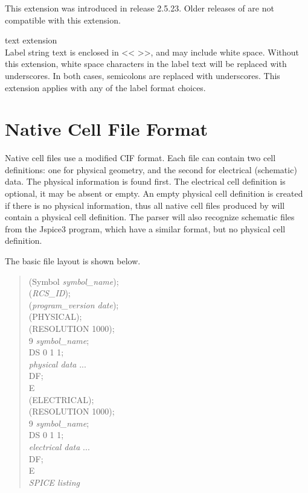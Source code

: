 \begin{description}
This extension was introduced in release 2.5.23.  Older releases
of {\Xic} are not compatible with this extension.

\item{\cb text extension}\\
Label string text is enclosed in {\vt << >>}, and may include white
space.  Without this extension, white space characters in the label
text will be replaced with underscores.  In both cases, semicolons are
replaced with underscores.  This extension applies with any of the
label format choices.
\end{description}

\section{Native Cell File Format}

Native cell files use a modified CIF format.  Each file can contain
two cell definitions:  one for physical geometry, and the second for
electrical (schematic) data.  The physical information is found first. 
The electrical cell definition is optional, it may be absent or empty. 
An empty physical cell definition is created if there is no physical
information, thus all native cell files produced by {\Xic} will
contain a physical cell definition.  The parser will also recognize
schematic files from the {\et Jspice3} program, which have a similar
format, but no physical cell definition. 

The basic file layout is shown below.

\begin{quote}\vt
(Symbol {\it symbol\_name\/});\\
({\it RCS\_ID\/});\\
({\it program\_version date\/});\\
(PHYSICAL);\\
(RESOLUTION 1000);\\
9 {\it symbol\_name\/};\\
DS 0 1 1;\\
{\it physical data\/} ...\\
DF;\\
E\\
(ELECTRICAL);\\
(RESOLUTION 1000);\\
9 {\it symbol\_name\/};\\
DS 0 1 1;\\
{\it electrical data\/} ...\\
DF;\\
E\\
{\it SPICE listing}
\end{quote}

